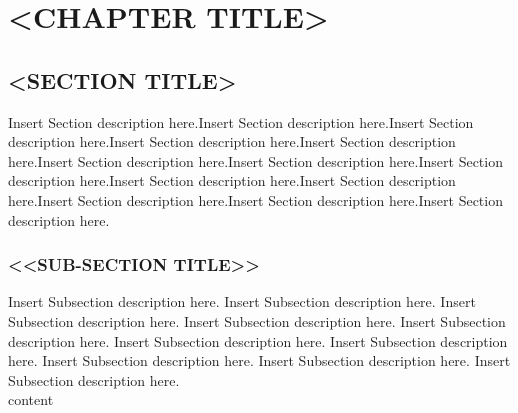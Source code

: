 \AddToShipoutPicture*{\BackgroundPic}
\chapter{<CHAPTER TITLE>}
\newpage
\section{<SECTION TITLE>}\label{sec:first}
Insert Section description here.Insert Section description here.Insert Section description here.Insert Section description here.Insert Section description here.Insert Section description here.Insert Section description here.Insert Section description here.Insert Section description here.Insert Section description here.Insert Section description here.Insert Section description here.Insert Section description here.
\\
\subsection{<<SUB-SECTION TITLE>>}
Insert Subsection description here. Insert Subsection description here. Insert Subsection description here. Insert Subsection description here. Insert Subsection description here. Insert Subsection description here. Insert Subsection description here. Insert Subsection description here. Insert Subsection description here. Insert Subsection description here. 
\\
{content}


  



